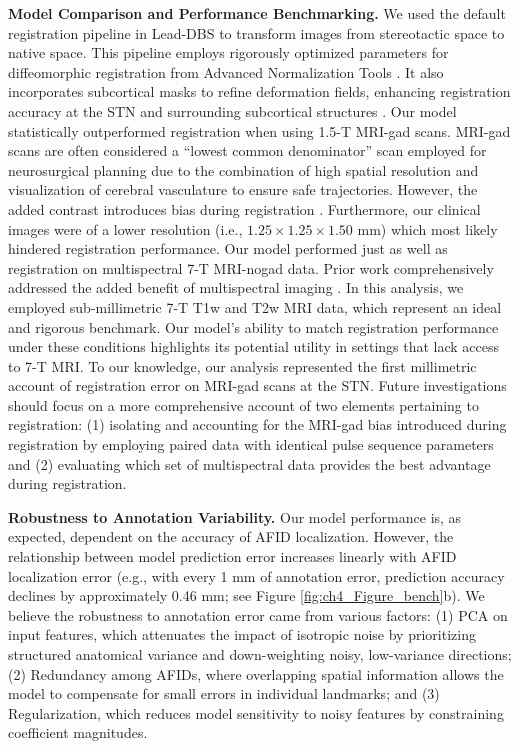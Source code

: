\textbf{Model Comparison and Performance Benchmarking.} We used the default registration pipeline in Lead-DBS to transform images from stereotactic space to native space. This pipeline employs rigorously optimized parameters \cite{Ewert2019-cc,Schonecker2009-xj} for diffeomorphic registration from Advanced Normalization Tools \cite{Avants2008-ek}. It also incorporates subcortical masks to refine deformation fields, enhancing registration accuracy at the STN and surrounding subcortical structures \cite{Ewert2019-cc, Schonecker2009-xj}. Our model statistically outperformed registration when using 1.5-T MRI-gad scans. MRI-gad scans are often considered a “lowest common denominator” scan employed for neurosurgical planning due to the combination of high spatial resolution and visualization of cerebral vasculature to ensure safe trajectories. However, the added contrast introduces bias during registration \cite{Abbass2022-lf, Abbass2025-el, Ogunsanya2024-uf}. Furthermore, our clinical images were of a lower resolution (i.e., \( 1.25 \times 1.25 \times 1.50 \) mm) which most likely hindered registration performance. Our model performed just as well as registration on multispectral 7-T MRI-nogad data. Prior work comprehensively addressed the added benefit of multispectral imaging \cite{Ewert2019-cc}. In this analysis, we employed sub-millimetric 7-T T1w and T2w MRI data, which represent an ideal and rigorous benchmark. Our model’s ability to match registration performance under these conditions highlights its potential utility in settings that lack access to 7-T MRI. To our knowledge, our analysis represented the first millimetric account of registration error on MRI-gad scans at the STN. Future investigations should focus on a more comprehensive account of two elements pertaining to registration: (1) isolating and accounting for the MRI-gad bias introduced during registration by employing paired data with identical pulse sequence parameters and (2) evaluating which set of multispectral data provides the best advantage during registration.

\textbf{Robustness to Annotation Variability.} Our model performance is, as expected, dependent on the accuracy of AFID localization. However, the relationship between model prediction error increases linearly with AFID localization error (e.g., with every 1 mm of annotation error, prediction accuracy declines by approximately 0.46 mm; see Figure \ref{fig:ch4_Figure_bench}b). We believe the robustness to annotation error came from various factors: (1) PCA on input features, which attenuates the impact of isotropic noise by prioritizing structured anatomical variance and down-weighting noisy, low-variance directions; (2) Redundancy among AFIDs, where overlapping spatial information allows the model to compensate for small errors in individual landmarks; and (3) Regularization, which reduces model sensitivity to noisy features by constraining coefficient magnitudes.

